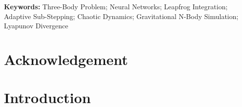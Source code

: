 \documentclass[12pt]{article}
\begin{document}
\vspace{0.5cm}
\noindent\textbf{Keywords:} Three-Body Problem; Neural Networks;
Leapfrog Integration; Adaptive Sub-Stepping; Chaotic Dynamics; Gravitational N-Body Simulation; Lyapunov Divergence

\newpage
\thispagestyle{plain}

\section*{Acknowledgement}

\vspace{3cm}

%
%

\newpage
{}
{}



\newpage
\renewcommand{\contentsname}{Table of Contents}
\tableofcontents

\newpage
{}
\setcounter{page}{1}


\section{Introduction}
\label{sec:intro}
\end{document}
